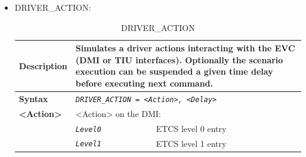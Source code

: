 \begin{itemize}
	\item DRIVER\_ACTION:

		\begin{longtable}{|l|l|l|}
			\caption{DRIVER\_ACTION}\\
			\hline

				\begin{minipage}[t]{0.22\linewidth} \textbf{Description} \end{minipage}
			&	\multicolumn{2}{l|}{ \begin{minipage}[t]{0.78\linewidth} Simulates a driver actions interacting with the EVC (DMI or TIU interfaces). Optionally the scenario execution can be suspended a given time delay before executing next command. \end{minipage} } \\

			\hline

				\begin{minipage}[t]{0.22\linewidth} \textbf{Syntax}	\end{minipage}
			&	\multicolumn{2}{l|}{ \begin{minipage}[t]{0.78\linewidth} \emph{\texttt{DRIVER\_ACTION = <Action>, <Delay>}}	\end{minipage} } \\

			\hline

				\multirow{1}{*}{ \begin{minipage}[t]{0.22\linewidth} \textbf{<Action>} \end{minipage} }
			&	\multicolumn{2}{l|}{ \begin{minipage}[t]{0.78\linewidth} <Action> on the DMI: \end{minipage} } \\

			\hline

			&	\begin{minipage}[t]{0.30\linewidth} \emph{\texttt{Level0}} \end{minipage}
			&	\begin{minipage}[t]{0.38\linewidth} ETCS level 0 entry \end{minipage} \\

			\hline

			&	\begin{minipage}[t]{0.30\linewidth} \emph{\texttt{Level1}} \end{minipage}
			&	\begin{minipage}[t]{0.38\linewidth} ETCS level 1 entry \end{minipage} \\


\end{longtable}
\end{itemize}
